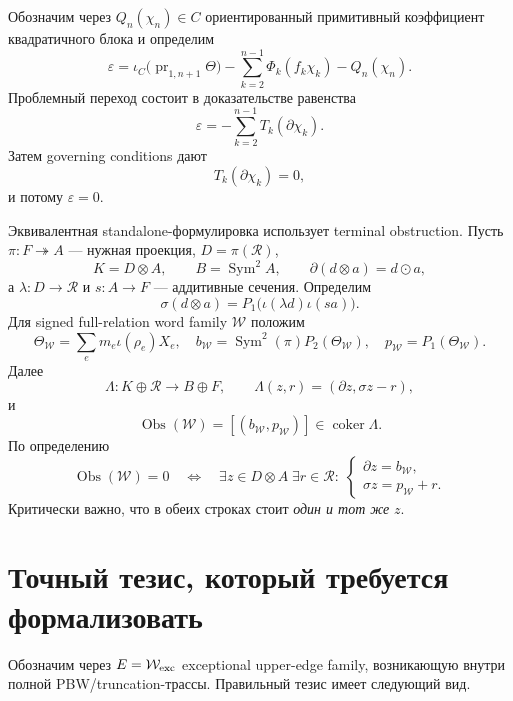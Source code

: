 \documentclass[11pt,a4paper]{article}
\theoremstyle{definition}
\theoremstyle{remark}
\newcommand{\Sym}{\operatorname{Sym}}
\newcommand{\pr}{\operatorname{pr}}
\newcommand{\Rel}{\mathcal R}
\newcommand{\Obs}{\operatorname{Obs}}
\newcommand{\coker}{\operatorname{coker}}
\newcommand{\eps}{\varepsilon}
\begin{document}
Обозначим через $Q_n(\chi_n)\in C$ ориентированный примитивный коэффициент
квадратичного блока и определим
\begin{equation}\label{eq:eps-def}
 \eps=
 \iota_C\bigl(\pr_{1,n+1}\Theta\bigr)
 -\sum_{k=2}^{n-1}\Phi_k(f_k\chi_k)
 -Q_n(\chi_n).
\end{equation}
Проблемный переход состоит в доказательстве равенства
\begin{equation}\label{eq:terminal-discrepancy}
 \eps=-\sum_{k=2}^{n-1}T_k(\partial\chi_k).
\end{equation}
Затем governing conditions дают
\begin{equation}\label{eq:T-vanish}
 T_k(\partial\chi_k)=0,
\end{equation}
и потому $\eps=0$.

Эквивалентная standalone-формулировка использует terminal obstruction. Пусть
$\pi:F\twoheadrightarrow A$ --- нужная проекция, $D=\pi(\Rel)$,
\[
 K=D\otimes A,
 \qquad B=\Sym^2A,
 \qquad \partial(d\otimes a)=d\odot a,
\]
а $\lambda:D\to\Rel$ и $s:A\to F$ --- аддитивные сечения. Определим
\[
 \sigma(d\otimes a)
 =P_1\bigl(\iota(\lambda d)\iota(sa)\bigr).
\]
Для signed full-relation word family $\mathcal W$ положим
\[
 \Theta_{\mathcal W}=\sum_e m_e\iota(\rho_e)X_e,
 \quad
 b_{\mathcal W}=\Sym^2(\pi)P_2(\Theta_{\mathcal W}),
 \quad
 p_{\mathcal W}=P_1(\Theta_{\mathcal W}).
\]
Далее
\[
 \Lambda:K\oplus\Rel\longrightarrow B\oplus F,
 \qquad
 \Lambda(z,r)=(\partial z,\sigma z-r),
\]
и
\[
 \Obs(\mathcal W)
 =[(b_{\mathcal W},p_{\mathcal W})]\in\coker\Lambda.
\]
По определению
\begin{equation}\label{eq:obstruction-criterion}
 \Obs(\mathcal W)=0
 \quad\Longleftrightarrow\quad
 \exists z\in D\otimes A\;\exists r\in\Rel:\;
 \begin{cases}
  \partial z=b_{\mathcal W},\\
  \sigma z=p_{\mathcal W}+r.
 \end{cases}
\end{equation}
Критически важно, что в обеих строках стоит \emph{один и тот же} $z$.

\section{Точный тезис, который требуется формализовать}

Обозначим через $E=\mathcal W_{\rm exc}$ exceptional upper-edge family,
возникающую внутри полной PBW/truncation-трассы. Правильный тезис имеет
следующий вид.
\end{document}
